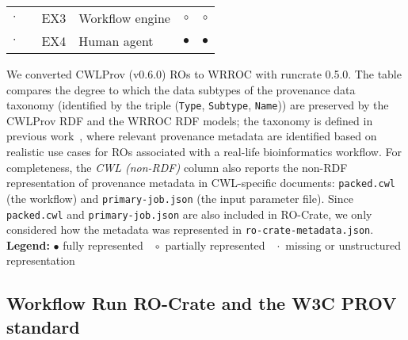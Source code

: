 \documentclass[10pt,letterpaper]{article}
\begin{document}
\begin{table}[ht]
\begin{adjustwidth}{-5cm}{0in}
\begin{tabular}{c|r|l|l|c|c}
$\cdot$ & & EX3 & Workflow engine         & $\circ$ & $\circ$  \\  
$\cdot$ & & EX4 & Human agent             & $\bullet$ & $\bullet$  \\ \hline
\end{tabular}
\begin{flushleft}
  We converted CWLProv (v0.6.0) ROs to WRROC with runcrate 0.5.0. The table compares the
  degree to which the data subtypes of the provenance data taxonomy
  (identified by the triple (\texttt{Type}, \texttt{Subtype}, \texttt{Name})) are preserved
  by the CWLProv RDF and the WRROC RDF models; the taxonomy is defined in previous work~\cite{De Wit 2022},
  where relevant provenance metadata are identified based on realistic
  use cases for ROs associated with a real-life bioinformatics workflow.
%
For completeness, the \emph{CWL (non-RDF)} column also reports the non-RDF representation of provenance metadata
in CWL-specific documents: \texttt{packed.cwl} (the workflow) and \texttt{primary-job.json} (the input parameter file).
%
Since \texttt{packed.cwl} and \texttt{primary-job.json} are also included in RO-Crate, we only considered how the metadata was represented in \texttt{ro-crate-metadata.json}. \\
\textbf{Legend:} $\bullet$ fully represented  $\;\;\circ$ partially represented   $\;\;\cdot$ missing or unstructured representation 
\end{flushleft}
\label{analysis_table}
\end{adjustwidth}
\end{table}

\subsection{Workflow Run RO-Crate and the W3C PROV standard}
\end{document}
